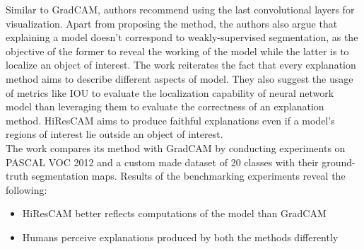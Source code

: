 \documentclass[../report.tex]{subfiles}
\begin{document}
	Similar to GradCAM, authors recommend using the last convolutional layers for visualization. Apart from proposing the method, the authors also argue that explaining a model doesn’t correspond to weakly-supervised segmentation, as the objective of the former to reveal the working of the model while the latter is to localize an object of interest. The work reiterates the fact that every explanation method aims to describe different aspects of model. They also suggest the usage of metrics like IOU to evaluate the localization capability of neural network model than leveraging them to evaluate the correctness of an explanation method. HiResCAM aims to produce faithful explanations even if a model’s regions of interest lie outside an object of interest.\\
	The work compares its method with GradCAM by conducting experiments on PASCAL VOC 2012 \cite{pascal-voc-2012} and a custom made dataset of 20 classes with their ground-truth segmentation maps. Results of the benchmarking experiments reveal the following:
	\begin{itemize}
		\item HiResCAM better reflects computations of the model than GradCAM
		\item Humans perceive explanations produced by both the methods differently
	\end{itemize}
	
	
\end{document}
